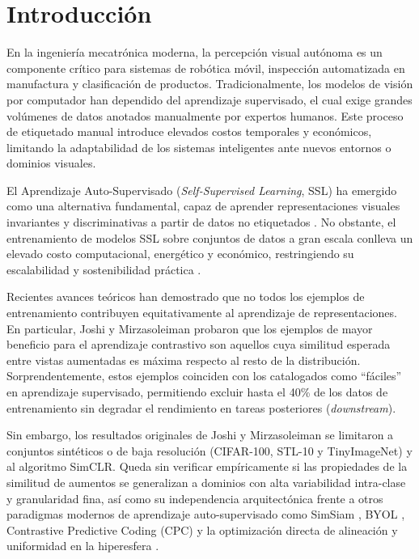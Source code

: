 \section{Introducción}
\label{sec:intro}

En la ingeniería mecatrónica moderna, la percepción visual autónoma es un componente crítico para sistemas de robótica móvil, inspección automatizada en manufactura y clasificación de productos. Tradicionalmente, los modelos de visión por computador han dependido del aprendizaje supervisado, el cual exige grandes volúmenes de datos anotados manualmente por expertos humanos. Este proceso de etiquetado manual introduce elevados costos temporales y económicos, limitando la adaptabilidad de los sistemas inteligentes ante nuevos entornos o dominios visuales.

El Aprendizaje Auto-Supervisado (\textit{Self-Supervised Learning}, SSL) ha emergido como una alternativa fundamental, capaz de aprender representaciones visuales invariantes y discriminativas a partir de datos no etiquetados \cite{chen2021simsiam, grill2020byol}. No obstante, el entrenamiento de modelos SSL sobre conjuntos de datos a gran escala conlleva un elevado costo computacional, energético y económico, restringiendo su escalabilidad y sostenibilidad práctica \cite{mirzasoleiman2020coresets}.

Recientes avances teóricos han demostrado que no todos los ejemplos de entrenamiento contribuyen equitativamente al aprendizaje de representaciones. En particular, Joshi y Mirzasoleiman \cite{joshi2023sas} probaron que los ejemplos de mayor beneficio para el aprendizaje contrastivo son aquellos cuya similitud esperada entre vistas aumentadas es máxima respecto al resto de la distribución. Sorprendentemente, estos ejemplos coinciden con los catalogados como ``fáciles'' en aprendizaje supervisado, permitiendo excluir hasta el 40\% de los datos de entrenamiento sin degradar el rendimiento en tareas posteriores (\textit{downstream}).

Sin embargo, los resultados originales de Joshi y Mirzasoleiman \cite{joshi2023sas} se limitaron a conjuntos sintéticos o de baja resolución (CIFAR-100, STL-10 y TinyImageNet) y al algoritmo SimCLR. Queda sin verificar empíricamente si las propiedades de la similitud de aumentos se generalizan a dominios con alta variabilidad intra-clase y granularidad fina, así como su independencia arquitectónica frente a otros paradigmas modernos de aprendizaje auto-supervisado como SimSiam \cite{chen2021simsiam}, BYOL \cite{grill2020byol}, Contrastive Predictive Coding (CPC) \cite{oord2018cpc} y la optimización directa de alineación y uniformidad en la hiperesfera \cite{wang2020alignuniform}.

